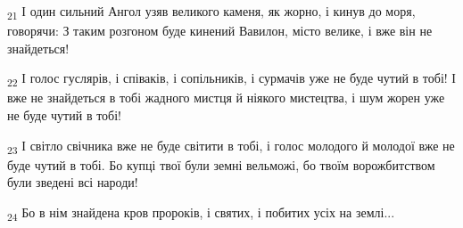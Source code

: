 \begin{tcolorbox}
\textsubscript{21} І один сильний Ангол узяв великого каменя, як жорно, і кинув до моря, говорячи: З таким розгоном буде кинений Вавилон, місто велике, і вже він не знайдеться!
\end{tcolorbox}
\begin{tcolorbox}
\textsubscript{22} І голос гуслярів, і співаків, і сопільників, і сурмачів уже не буде чутий в тобі! І вже не знайдеться в тобі жадного мистця й ніякого мистецтва, і шум жорен уже не буде чутий в тобі!
\end{tcolorbox}
\begin{tcolorbox}
\textsubscript{23} І світло свічника вже не буде світити в тобі, і голос молодого й молодої вже не буде чутий в тобі. Бо купці твої були земні вельможі, бо твоїм ворожбитством були зведені всі народи!
\end{tcolorbox}
\begin{tcolorbox}
\textsubscript{24} Бо в нім знайдена кров пророків, і святих, і побитих усіх на землі...
\end{tcolorbox}
